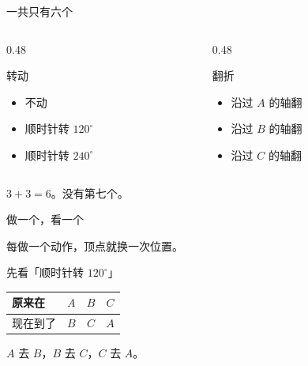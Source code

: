 \documentclass[10pt]{beamer}
\begin{document}
\begin{frame}{一共只有六个}
  \begin{columns}[T]
    \begin{column}{0.48\textwidth}
      \begin{block}{转动}
        \begin{itemize}
          \item 不动
          \item 顺时针转 \(120^\circ\)
          \item 顺时针转 \(240^\circ\)
        \end{itemize}
      \end{block}
    \end{column}
    \begin{column}{0.48\textwidth}
      \begin{block}{翻折}
        \begin{itemize}
          \item 沿过 \(A\) 的轴翻
          \item 沿过 \(B\) 的轴翻
          \item 沿过 \(C\) 的轴翻
        \end{itemize}
      \end{block}
    \end{column}
  \end{columns}
  \pause
  \begin{center}
    \(3+3=6\)。\quad 没有第七个。
  \end{center}
\end{frame}

\begin{frame}{做一个，看一个}
  \pause
  \begin{center}
    {\large 每做一个动作，顶点就换一次位置。}
  \end{center}
\end{frame}

\begin{frame}{先看「顺时针转 \(120^\circ\)」}
  \pause
  \begin{center}
  \begin{tabular}{@{}lccc@{}}
    \toprule
    原来在 & \(A\) & \(B\) & \(C\) \\
    \midrule
    现在到了 & \(B\) & \(C\) & \(A\) \\
    \bottomrule
  \end{tabular}
  \end{center}
  \pause
  \begin{center}
    {\large \(A\) 去 \(B\)，\(B\) 去 \(C\)，\(C\) 去 \(A\)。}
  \end{center}
\end{frame}
\end{document}
